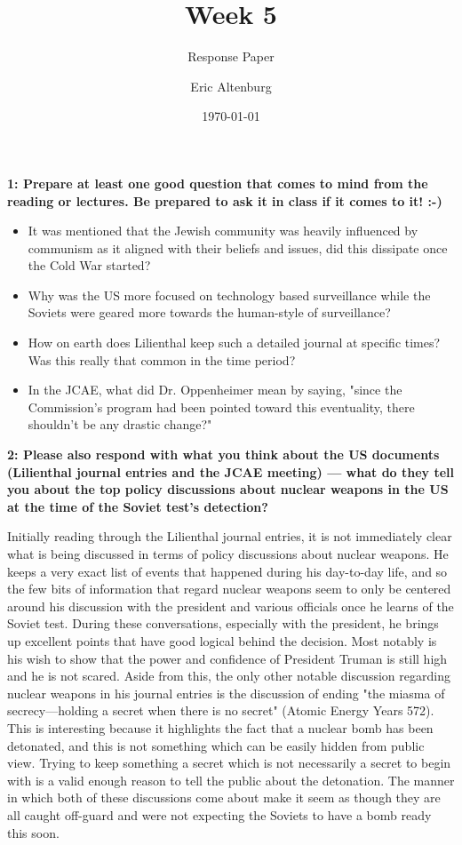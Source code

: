 \documentclass[12pt]{turabian-researchpaper}
\title{Week 5}
\subtitle{Response Paper}
\author{Eric Altenburg}
\date{\today}
\newcommand\question[2]{\textbf{#1: #2}}
\begin{document}
	\maketitle

	\question{1}{Prepare at least one good question that comes to mind from the reading or lectures. Be prepared to ask it in class if it comes to it! :-)}

		\begin{itemize}
			\item It was mentioned that the Jewish community was heavily influenced by communism as it aligned with their beliefs and issues, did this dissipate once the Cold War started?
			\item Why was the US more focused on technology based surveillance while the Soviets were geared more towards the human-style of surveillance?
			\item How on earth does Lilienthal keep such a detailed journal at specific times? Was this really that common in the time period?
			\item In the JCAE, what did Dr. Oppenheimer mean by saying, "since the Commission's program had been pointed toward this eventuality, there shouldn't be any drastic change?"
		\end{itemize}

	\question{2}{Please also respond with what you think about the US documents (Lilienthal journal entries and the JCAE meeting) — what do they tell you about the top policy discussions about nuclear weapons in the US at the time of the Soviet test's detection?}

		Initially reading through the Lilienthal journal entries, it is not immediately clear what is being discussed in terms of policy discussions about nuclear weapons. He keeps a very exact list of events that happened during his day-to-day life, and so the few bits of information that regard nuclear weapons seem to only be centered around his discussion with the president and various officials once he learns of the Soviet test. During these conversations, especially with the president, he brings up excellent points that have good logical behind the decision. Most notably is his wish to show that the power and confidence of President Truman is still high and he is not scared. Aside from this, the only other notable discussion regarding nuclear weapons in his journal entries is the discussion of ending "the miasma of secrecy—holding a secret when there is no secret" (Atomic Energy Years 572). This is interesting because it highlights the fact that a nuclear bomb has been detonated, and this is not something which can be easily hidden from public view. Trying to keep something a secret which is not necessarily a secret to begin with is a valid enough reason to tell the public about the detonation. The manner in which both of these discussions come about make it seem as though they are all caught off-guard and were not expecting the Soviets to have a bomb ready this soon.
\end{document}
